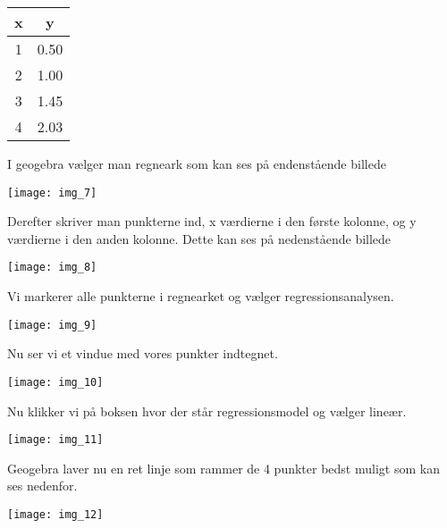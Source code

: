 \begin{tabular}{c|c}
x & y\\
\hline
1 & 0.50\\
2 & 1.00\\
3 & 1.45\\
4 & 2.03
\end{tabular}

I geogebra vælger man regneark som kan ses på endenstående billede 

\texttt{[image: img\_7]}

Derefter skriver man punkterne ind, x værdierne i den første kolonne, og y værdierne i den anden kolonne. Dette kan ses på nedenstående billede

\texttt{[image: img\_8]}

Vi markerer alle punkterne i regnearket og vælger regressionsanalysen.

\texttt{[image: img\_9]}

Nu ser vi et vindue med vores punkter indtegnet.

\texttt{[image: img\_10]}

Nu klikker vi på boksen hvor der står regressionsmodel og vælger lineær.

\texttt{[image: img\_11]}

Geogebra laver nu en ret linje som rammer de 4 punkter bedst muligt som kan ses nedenfor.

\texttt{[image: img\_12]}



